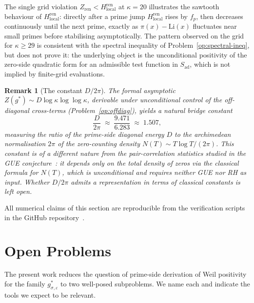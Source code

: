 \documentclass[11pt]{article}
\newtheorem*{remark}{Remark}
\newcommand{\Hren}{H_{\mathrm{local}}^{\mathrm{ren}}}
\newcommand{\Sad}{S_{\mathrm{ad}}}
\newcommand{\Zren}{Z_{\mathrm{ren}}}
\begin{document}
The single grid violation $\Zren<\Hren$ at $\kappa=20$ illustrates
the sawtooth behaviour of $\Hren$: directly after a prime jump
$\Hren$ rises by $f_p$, then decreases continuously until the
next prime, exactly as $\pi(x)-\mathrm{Li}(x)$ fluctuates near
small primes before stabilising asymptotically.
The pattern observed on the grid for $\kappa\ge 29$ is consistent
with the spectral inequality of Problem~\ref{op:spectral-ineq},
but does not prove it: the underlying object is the unconditional
positivity of the zero-side quadratic form for an admissible
test function in $\Sad$, which is not implied by finite-grid
evaluations.

\begin{remark}[The constant $D/2\pi$]
The formal asymptotic
$Z(g^*)\sim D\log\kappa\log\log\kappa$, derivable under
unconditional control of the off-diagonal cross-terms
(Problem~\ref{op:offdiag}), yields a natural bridge constant
\[
\frac{D}{2\pi} \;\approx\;
\frac{9.471}{6.283} \;\approx\; 1.507,
\]
measuring the ratio of the prime-side diagonal energy $D$ to
the archimedean normalisation $2\pi$ of the zero-counting
density $N(T)\sim T\log T/(2\pi)$.
This constant is of a different nature from the pair-correlation
statistics studied in the GUE conjecture~\cite{Montgomery}: it
depends only on the total density of zeros via the classical
formula for $N(T)$, which is unconditional and requires neither
GUE nor RH as input.
Whether $D/2\pi$ admits a representation in terms of classical
constants is left open.
\end{remark}

All numerical claims of this section are reproducible from the
verification scripts in the GitHub repository~\cite{Code}.

\section{Open Problems}
\label{sec:open}

The present work reduces the question of prime-side derivation
of Weil positivity for the family $g^*_{\sigma,\varepsilon}$ to
two well-posed subproblems.
We name each and indicate the tools we expect to be relevant.
\end{document}
